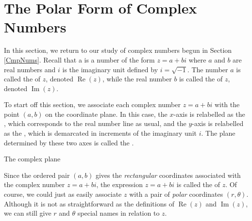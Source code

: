 \section{The Polar Form of Complex Numbers}

\label{PolarComplex}

In this section, we return to our study of complex numbers begun in Section \ref{CmpNums}.  Recall that a  is a number of the form $z = a + bi$ where $a$ and $b$ are real numbers and $i$ is the imaginary unit defined by $i = \sqrt{-1}$. The number $a$ is called the    of $z$, denoted  $\operatorname{Re}(z)$, while the real number $b$ is called the   of $z$, denoted $\operatorname{Im}(z)$.  

To start off this section, we associate each complex number $z = a+bi$ with the point $(a,b)$ on the coordinate plane.  In this case, the $x$-axis is relabelled as the , which corresponds to the real number line as usual,  and the $y$-axis is relabelled as the , which is demarcated in increments of the imaginary unit $i$.  The plane determined by these two axes is called the .


\medskip

\noindent\begin{minipage}{\textwidth}
\begin{center}
\end{center}
\captionsetup{type=figure}
\caption{The complex plane}\label{fig:complexplane}
\end{minipage}

\medskip

Since the ordered pair $(a,b)$ gives the \textit{rectangular} coordinates associated with the complex number $z = a+bi$, the expression $z=a+bi$ is called the  of $z$. Of course, we could just as easily associate $z$ with a pair of \textit{polar} coordinates $(r,\theta)$.  Although it is not as straightforward as the definitions of $\operatorname{Re}(z)$ and $\operatorname{Im}(z)$, we can still give $r$ and $\theta$ special names in relation to $z$.

